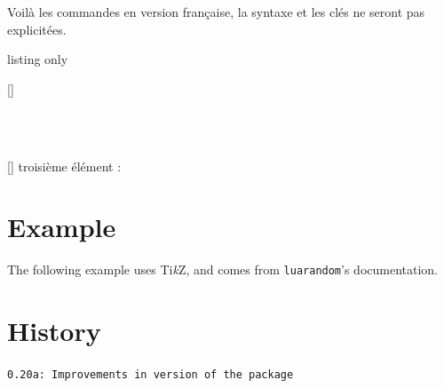 \documentclass[11pt,a4paper]{ltxdoc}
\providecommand\tikzlogo{Ti\textit{k}Z}
\let\TikZ\tikzlogo
\begin{document}
Voilà les commandes en version française, la syntaxe et les clés ne seront pas explicitées.

\begin{DemoCode}{listing only}
\ListeRandint[Min=..,Max=..,Nb=..,Repet=..,Graine=..,Tri=..,Sep=..,Exclure=..]{\macro}

[\macrores]
\end{DemoCode}

\begin{DemoCode}{}
\ListeRandint[Min=5,Max=15,Nb=7,Repet,Tri=croiss,Sep={/}]{\maliste}\maliste\\
\end{DemoCode}

\begin{DemoCode}{}
\ListeRandint[Min=50,Max=100,Nb=10,Repet,Tri=croiss]{\malisteB}\malisteB\\
[\montroisieme]%
troisième élément : \montroisieme
\end{DemoCode}

\pagebreak

\section{Example}

The following example uses \TikZ, and comes from \texttt{luarandom}'s documentation.

\begin{DemoCode}{}
\end{DemoCode}

\pagebreak

\section{History}

\texttt{0.20a: Improvements in  version of the package}
\end{document}

